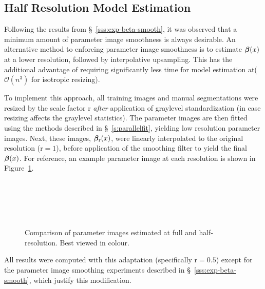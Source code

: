 \subsection{Half Resolution Model Estimation}\label{ss:halfres}
Following the results from \S~\ref{sss:exp-beta-smooth},
it was observed that a minimum amount of parameter image smoothness is always desirable.
An alternative method to enforcing parameter image smoothness
is to estimate $\bm{\beta}(x)$ at a lower resolution, followed by interpolative upsampling.
This has the additional advantage of requiring significantly less time for model estimation
at($\mathcal{O}(n^3)$ for isotropic resizing).
\par
To implement this approach, all training images and manual segmentations
were resized by the scale factor $\mathrm{r}$
\textit{after} application of graylevel standardization
(in case resizing affects the graylevel statistics).
The parameter images are then fitted using the methods described in \S~\ref{s:parallelfit},
yielding low resolution parameter images.
Next, these images, $\bm{\beta}_{\mathrm{r}}(x)$,
were linearly interpolated to the original resolution ($\mathrm{r} = 1$),
before application of the smoothing filter to yield the final $\bm{\beta}(x)$.
For reference, an example parameter image at each resolution
is shown in Figure~\ref{fig:beta-r}.
\par
\begin{figure}
  \centering
  \\[0.5em]
  \\[0.5em]
  \\[0.5em]
  \\[0.5em]
  \caption{Comparison of parameter images estimated at full and half-resolution.
  Best viewed in colour.}%
  \label{fig:beta-r}
\end{figure}
All results were computed with this adaptation (specifically $\mathrm{r} = 0.5$)
except for the parameter image smoothing experiments described in \S~\ref{sss:exp-beta-smooth},
which justify this modification.
